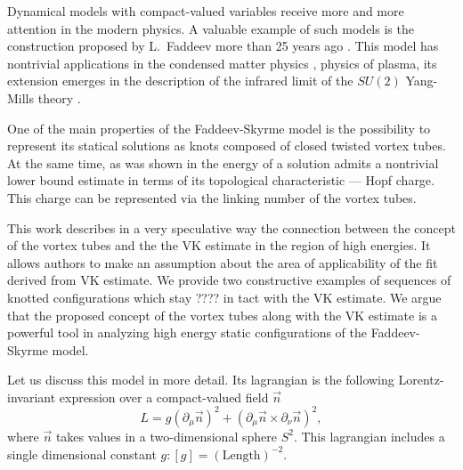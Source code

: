 \documentclass[a4paper,12pt]{article}
\newcommand{\prm}{\partial_{\mu}}
\newcommand{\prn}{\partial_{\nu}}
\begin{document}
	Dynamical models with compact-valued variables receive more 
	and more attention in the modern physics.
	A valuable example of such models is the construction
	proposed by L.~Faddeev more than 25 years ago
\cite{LF}.
        This model has nontrivial applications in the condensed matter 
        physics
\cite{},
        physics of plasma, its extension emerges in the description
        of the infrared limit of the 
    $ SU(2) $
        Yang-Mills theory
\cite{}.

        One of the main properties of the Faddeev-Skyrme model is the
        possibility to represent its statical solutions as knots 
        composed of closed twisted vortex tubes.
        At the same time, as was shown in
\cite{VK}
        the energy of a solution admits a nontrivial
        lower bound estimate in terms of its topological characteristic
        --- Hopf charge. This charge can be represented via
        the linking number of the vortex tubes.

        This work describes in a very speculative way 
        the connection between the concept of the vortex tubes and the
        the VK estimate in the region of high energies. 
        It allows authors to make an assumption about the 
        area of applicability of the fit derived from VK estimate. 
        We provide two constructive examples of sequences of
	knotted configurations which stay
????        in tact with the VK estimate.
	We argue that the proposed concept of the vortex
	tubes along with the VK estimate is a powerful tool in
	analyzing high energy static configurations of the
	Faddeev-Skyrme model.

        Let us discuss this model in more detail.
        Its lagrangian is the following Lorentz-invariant expression
        over a compact-valued field 
    $ \vec{n} $
\begin{equation}
    L = g (\prm \vec{n})^{2} + (\prm \vec{n} \times \prn \vec{n})^{2} ,
\end{equation}
        where 
    $ \vec{n} $ 
        takes values in a two-dimensional sphere 
    $ S^{2} $.
        This lagrangian includes a single dimensional constant 
    $ g : [g] = (\text{Length})^{-2}$.
\end{document}
